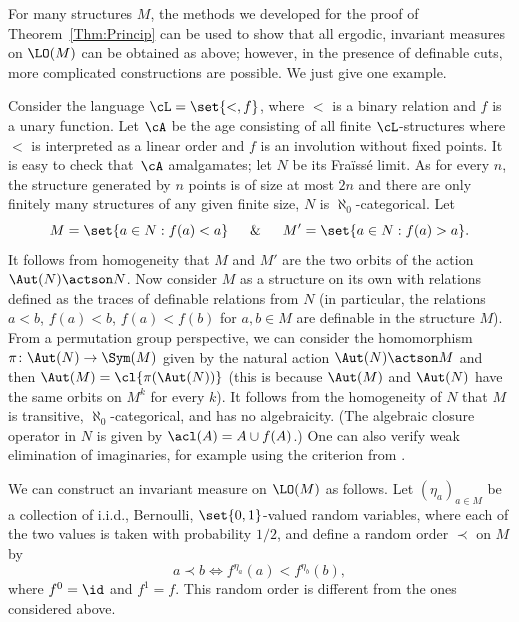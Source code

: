 For many structures $M$, the methods we developed for the proof of Theorem~\ref{Thm:Princip} can be used to show that all ergodic, invariant measures on $\LO(M)$ can be obtained as above; however, in the presence of definable cuts, more complicated constructions are possible. We just give one example.

Consider the language $\cL = \set{<, f}$, where $<$ is a binary relation and $f$ is a unary function. Let $\cA$ be the age consisting of all finite $\cL$-structures where $<$ is interpreted as a linear order and $f$ is an involution without fixed points. It is easy to check that~$\cA$ amalgamates; let $N$ be its Fraïssé limit. As for every $n$, the structure generated by $n$ points is of size at most $2n$ and there are only finitely many structures of any given finite size, $N$ is $\aleph_0$-categorical. Let
\[
M = \set{a \in N : f(a) < a}\quad\And\quad M' = \set{a \in N : f(a) > a}.
\]
It follows from homogeneity that $M$ and $M'$ are the two orbits of the action $\Aut(N) \actson\nobreak N$. Now consider $M$ as a structure on its own with relations defined as the traces of definable relations from $N$ (in particular, the relations $a < b$, $f(a) < b$, $f(a) < f(b)$ for $a, b \in M$ are definable in the structure $M$). From a permutation group perspective, we can consider the homomorphism $\pi \colon \Aut(N) \to \Sym(M)$ given by the natural action $\Aut(N) \actson M$ and then $\Aut(M) = \cl{\pi(\Aut(N))}$ (this is because $\Aut(M)$ and $\Aut(N)$ have the same orbits on $M^k$ for every $k$). It follows from the homogeneity of $N$ that $M$ is transitive, $\aleph_0$-categorical, and has no algebraicity. (The algebraic closure operator in $N$ is given by $\acl(A) = A \cup f(A)$.) One can also verify weak elimination of imaginaries, for example using the criterion from \cite[Prop.\,10.1]{Rideau2019}.

We can construct an invariant measure on $\LO(M)$ as follows. Let $(\eta_a)_{a \in M}$ be a collection of i.i.d., Bernoulli, $\set{0, 1}$-valued random variables, where each of the two values is taken with probability $1/2$, and define a random order $\prec$ on $M$ by
\begin{equation*}
a \prec b \iff f^{\eta_a}(a) < f^{\eta_b}(b),
\end{equation*}
where $f^0 = \id$ and $f^1 = f$. This random order is different from the ones considered above.

